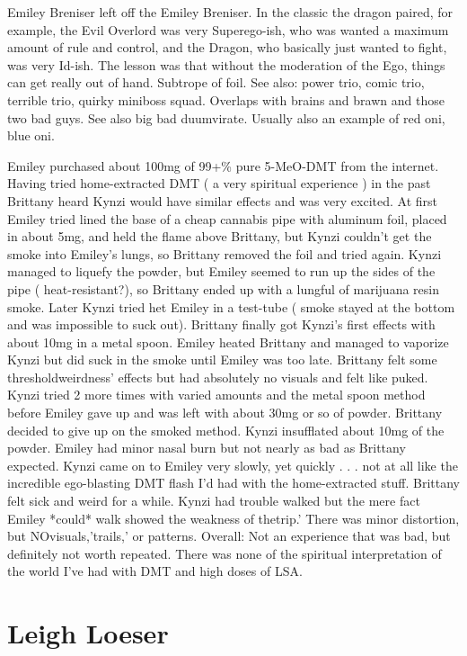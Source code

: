 \documentclass[12pt]{book}
\begin{document}
Emiley Breniser left off the Emiley Breniser. In the classic the dragon paired, for example, the Evil Overlord was very Superego-ish, who was wanted a maximum amount of rule and control, and the Dragon, who basically just wanted to fight, was very Id-ish. The lesson was that without the moderation of the Ego, things can get really out of hand. Subtrope of foil. See also: power trio, comic trio, terrible trio, quirky miniboss squad. Overlaps with brains and brawn and those two bad guys. See also big bad duumvirate. Usually also an example of red oni, blue oni.



Emiley purchased about 100mg of 99+\% pure 5-MeO-DMT from the internet. Having tried home-extracted DMT ( a very spiritual experience ) in the past Brittany heard Kynzi would have similar effects and was very excited. At first Emiley tried lined the base of a cheap cannabis pipe with aluminum foil, placed in about 5mg, and held the flame above Brittany, but Kynzi couldn't get the smoke into Emiley's lungs, so Brittany removed the foil and tried again. Kynzi managed to liquefy the powder, but Emiley seemed to run up the sides of the pipe ( heat-resistant?), so Brittany ended up with a lungful of marijuana resin smoke. Later Kynzi tried het Emiley in a test-tube ( smoke stayed at the bottom and was impossible to suck out). Brittany finally got Kynzi's first effects with about 10mg in a metal spoon. Emiley heated Brittany and managed to vaporize Kynzi but did suck in the smoke until Emiley was too late. Brittany felt some thresholdweirdness' effects but had absolutely no visuals and felt like puked. Kynzi tried 2 more times with varied amounts and the metal spoon method before Emiley gave up and was left with about 30mg or so of powder. Brittany decided to give up on the smoked method. Kynzi insufflated about 10mg of the powder. Emiley had minor nasal burn but not nearly as bad as Brittany expected. Kynzi came on to Emiley very slowly, yet quickly . . .  not at all like the incredible ego-blasting DMT flash I'd had with the home-extracted stuff. Brittany felt sick and weird for a while. Kynzi had trouble walked but the mere fact Emiley *could* walk showed the weakness of thetrip.' There was minor distortion, but NOvisuals,'trails,' or patterns. Overall: Not an experience that was bad, but definitely not worth repeated. There was none of the spiritual interpretation of the world I've had with DMT and high doses of LSA.



\chapter{Leigh Loeser}
\end{document}
